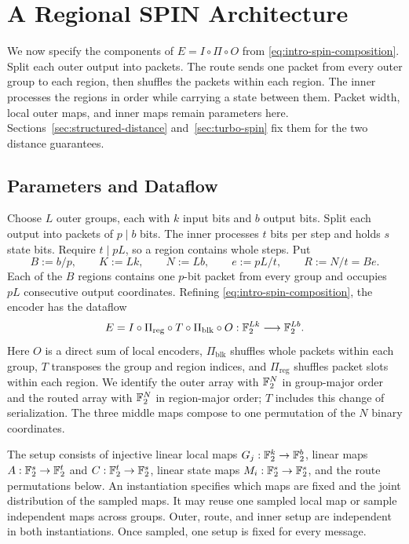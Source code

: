 \section{A Regional SPIN Architecture}
\label{sec:structured-spin}
\label{sec:regional-spin}

We now specify the components of $E=I\circ\Pi\circ O$ from
\eqref{eq:intro-spin-composition}. Split each outer output into packets.
The route sends one packet from every outer group to each region, then
shuffles the packets within each region. The inner processes the regions
in order while carrying a state between them. Packet width, local outer
maps, and inner maps remain parameters here. Sections~\ref{sec:structured-distance}
and~\ref{sec:turbo-spin} fix them for the two distance guarantees.

\subsection{Parameters and Dataflow}

Choose $L$ outer groups, each with $k$ input bits and $b$ output bits.
Split each output into packets of $p\mid b$ bits. The inner processes
$t$ bits per step and holds $s$ state bits. Require $t\mid pL$, so a
region contains whole steps. Put
\begin{equation}
 B:=b/p,\qquad K:=Lk,\qquad N:=Lb,\qquad
 e:=pL/t,\qquad R:=N/t=Be.
 \label{eq:structured-parameters}
\end{equation}
Each of the $B$ regions contains one $p$-bit packet from every group and
occupies $pL$ consecutive output coordinates. Refining
\eqref{eq:intro-spin-composition}, the encoder has the dataflow
\begin{equation}
 E=I\circ\Pi_{\mathrm{reg}}\circ T\circ\Pi_{\mathrm{blk}}\circ O
 :\mathbb F_2^{Lk}\longrightarrow\mathbb F_2^{Lb}.
 \label{eq:structured-dataflow}
\end{equation}
Here $O$ is a direct sum of local encoders, $\Pi_{\mathrm{blk}}$ shuffles
whole packets within each group, $T$ transposes the group and region
indices, and $\Pi_{\mathrm{reg}}$ shuffles packet slots within each region.
We identify the outer array with $\mathbb F_2^N$ in group-major order and the
routed array with $\mathbb F_2^N$ in region-major order; $T$ includes this change
of serialization. The three middle maps compose to one permutation of the
$N$ binary coordinates.

The setup consists of injective linear local maps
$G_j:\mathbb F_2^k\to\mathbb F_2^b$, linear maps $A:\mathbb F_2^s\to\mathbb F_2^t$ and
$C:\mathbb F_2^t\to\mathbb F_2^s$, linear state maps $M_i:\mathbb F_2^s\to\mathbb F_2^s$,
and the route permutations below. An instantiation specifies which maps
are fixed and the joint distribution of the sampled maps. It may reuse
one sampled local map or sample independent maps across groups. Outer,
route, and inner setup are independent in both instantiations. Once
sampled, one setup is fixed for every message.

